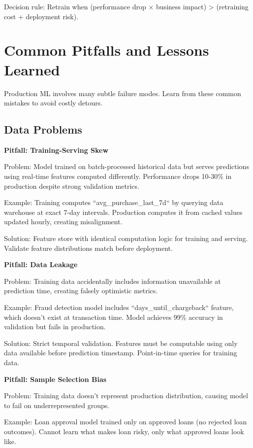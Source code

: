 Decision rule: Retrain when (performance drop $\times$ business impact) > (retraining cost + deployment risk).

\section{Common Pitfalls and Lessons Learned}

Production ML involves many subtle failure modes. Learn from these common mistakes to avoid costly detours.

\subsection{Data Problems}

\textbf{Pitfall: Training-Serving Skew}

Problem: Model trained on batch-processed historical data but serves predictions using real-time features computed differently. Performance drops 10-30\% in production despite strong validation metrics.

Example: Training computes ``avg\_purchase\_last\_7d`` by querying data warehouse at exact 7-day intervals. Production computes it from cached values updated hourly, creating misalignment.

Solution: Feature store with identical computation logic for training and serving. Validate feature distributions match before deployment.

\textbf{Pitfall: Data Leakage}

Problem: Training data accidentally includes information unavailable at prediction time, creating falsely optimistic metrics.

Example: Fraud detection model includes ``days\_until\_chargeback`` feature, which doesn't exist at transaction time. Model achieves 99\% accuracy in validation but fails in production.

Solution: Strict temporal validation. Features must be computable using only data available before prediction timestamp. Point-in-time queries for training data.

\textbf{Pitfall: Sample Selection Bias}

Problem: Training data doesn't represent production distribution, causing model to fail on underrepresented groups.

Example: Loan approval model trained only on approved loans (no rejected loan outcomes). Cannot learn what makes loan risky, only what approved loans look like.

